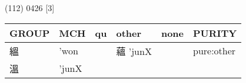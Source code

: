 \documentclass[14pt,a4paper]{scrartcl}
\begin{document}
(112) 0426 {[}3{]}

\begin{longtable}[c]{@{}llllll@{}}
\toprule
\begin{minipage}[b]{0.14\columnwidth}\raggedright\strut
GROUP
\strut\end{minipage} &
\begin{minipage}[b]{0.14\columnwidth}\raggedright\strut
MCH
\strut\end{minipage} &
\begin{minipage}[b]{0.14\columnwidth}\raggedright\strut
qu
\strut\end{minipage} &
\begin{minipage}[b]{0.14\columnwidth}\raggedright\strut
other
\strut\end{minipage} &
\begin{minipage}[b]{0.14\columnwidth}\raggedright\strut
none
\strut\end{minipage} &
\begin{minipage}[b]{0.14\columnwidth}\raggedright\strut
PURITY
\strut\end{minipage}\tabularnewline
\midrule
\endhead
\begin{minipage}[t]{0.14\columnwidth}\raggedright\strut
縕
\strut\end{minipage} &
\begin{minipage}[t]{0.14\columnwidth}\raggedright\strut
'won
\strut\end{minipage} &
\begin{minipage}[t]{0.14\columnwidth}\raggedright\strut
\strut\end{minipage} &
\begin{minipage}[t]{0.14\columnwidth}\raggedright\strut
蘊 'junX
\strut\end{minipage} &
\begin{minipage}[t]{0.14\columnwidth}\raggedright\strut
\strut\end{minipage} &
\begin{minipage}[t]{0.14\columnwidth}\raggedright\strut
pure:other
\strut\end{minipage}\tabularnewline
\begin{minipage}[t]{0.14\columnwidth}\raggedright\strut
溫
\strut\end{minipage} &
\begin{minipage}[t]{0.14\columnwidth}\raggedright\strut
'junX
\strut\end{minipage} &
\begin{minipage}[t]{0.14\columnwidth}\raggedright\strut
\strut\end{minipage} &

\end{longtable}
\end{document}
